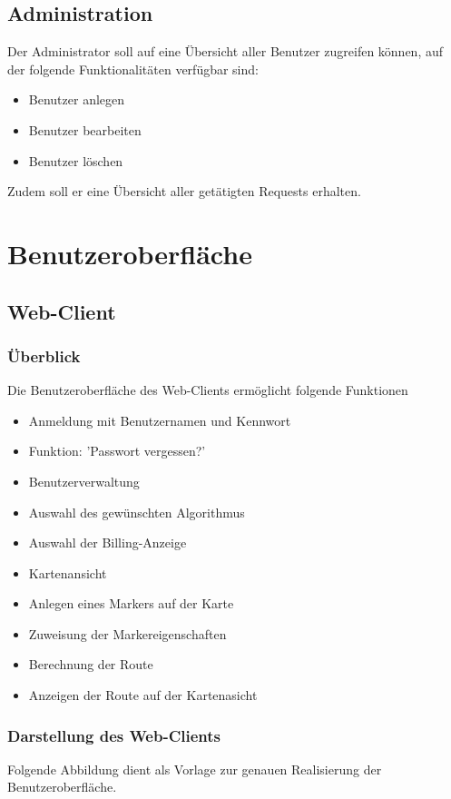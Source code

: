 \documentclass[a4paper,10pt,titlepage]{article}
\begin{document}
\subsection{Administration}
Der Administrator soll auf eine Übersicht aller Benutzer zugreifen können, auf der folgende Funktionalitäten verfügbar sind:
\begin{itemize}
 \item Benutzer anlegen
 \item Benutzer bearbeiten
 \item Benutzer löschen
\end{itemize}

Zudem soll er eine Übersicht aller getätigten Requests erhalten.

\clearpage
\section{Benutzeroberfläche}
\subsection{Web-Client}
\subsubsection{Überblick}
Die Benutzeroberfläche des Web-Clients ermöglicht folgende Funktionen
\begin{itemize}
\item Anmeldung mit Benutzernamen und Kennwort
\item Funktion: ’Passwort vergessen?’
\item Benutzerverwaltung
\item Auswahl des gewünschten Algorithmus
\item Auswahl der Billing-Anzeige 
\item Kartenansicht
\item Anlegen eines Markers auf der Karte
\item Zuweisung der Markereigenschaften
\item Berechnung der Route
\item Anzeigen der Route auf der Kartenasicht
\end{itemize}
\subsubsection{Darstellung des Web-Clients}
Folgende Abbildung dient als Vorlage zur genauen Realisierung der Benutzeroberfläche.
\end{document}
